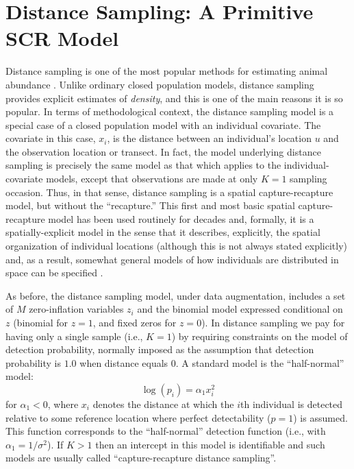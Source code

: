 \section{Distance Sampling: A Primitive SCR Model}

Distance sampling is one of the most popular methods for estimating
animal abundance \citep{burnham_etal:1980, buckland_etal:2001,
  buckland_etal:2004book}. Unlike ordinary closed population models,
distance sampling provides explicit estimates of {\it density}, and
this is one of the main reasons it is so popular.  In terms of
methodological context, the distance sampling model is a special case
of a closed population model with an individual covariate. The
covariate in this case, $x_{i}$, is the distance between an
individual's location $u$ and the observation location or transect. In
fact, the model underlying distance sampling is precisely the same
model as that which applies to the individual-covariate models, except
that observations are made at only $K=1$ sampling occasion. Thus, in
that sense, distance sampling is a spatial capture-recapture model,
but without the ``recapture.''  This first and most basic spatial
capture-recapture model has been used routinely for decades and,
formally, it is a spatially-explicit model in the sense that it
describes, explicitly, the spatial organization of individual
locations (although this is not always stated explicitly) and, as a
result, somewhat general models of how individuals are distributed in
space can be specified \citep{hedley_etal:1999, royle_etal:2004,
  johnson_etal:2010, niemi_fernandez:2010, sillett_etal:2011}.

As before, the distance sampling model, under data augmentation,
includes a set of $M$ zero-inflation variables $z_{i}$ and the
binomial model expressed conditional on $z$ (binomial for $z=1$, and
fixed zeros for $z=0$).  In distance sampling we pay for having only a
single sample (i.e., $K=1$) by requiring constraints on the model of
detection probability, normally imposed as the assumption that
detection probability is $1.0$ when distance equals 0.  A standard
model is the ``half-normal'' model:
\[
\log(p_{i}) = \alpha_{1} x_{i}^{2}
\]
for $\alpha_{1} < 0$, where $x_i$ denotes the distance at which the $i$th
individual is detected relative to some reference location where
perfect detectability ($p=1$) is assumed. This function corresponds to
the ``half-normal'' detection function (i.e., with $\alpha_{1} =
1/\sigma^{2}$).  If $K>1$ then an intercept in this model is
identifiable and such models are usually called ``capture-recapture
distance sampling''\citep{alpizar_pollock:1996,borchers_etal:1998}.

